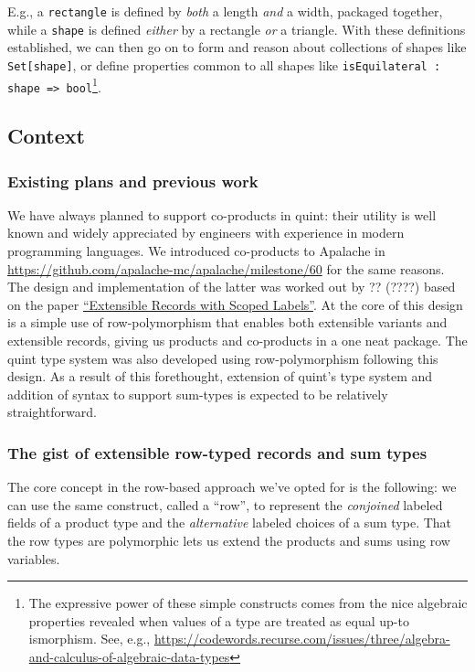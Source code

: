 \documentclass[11pt]{article}
\begin{document}
E.g., a \texttt{rectangle} is defined by \emph{both} a length \emph{and} a width,
packaged together, while a \texttt{shape} is defined \emph{either} by a rectangle
\emph{or} a triangle. With these definitions established, we can then go on
to form and reason about collections of shapes like \texttt{Set[shape]}, or
define properties common to all shapes like
\texttt{isEquilateral : shape => bool}\footnote{The expressive power of these simple constructs comes from the
nice algebraic properties revealed when values of a type are
treated as equal up-to ismorphism. See, e.g.,
\url{https://codewords.recurse.com/issues/three/algebra-and-calculus-of-algebraic-data-types}}.

\subsection{Context}
\label{sec:orgea625f3}
\subsubsection{Existing plans and previous work}
\label{sec:orgc77cf04}
We have always planned to support co-products in quint: their utility is well
known and widely appreciated by engineers with experience in modern programming
languages. We introduced co-products to Apalache in
\url{https://github.com/apalache-mc/apalache/milestone/60} for the same reasons.
The design and implementation of the latter was worked out by ?? (????)
based on the paper \href{https://www.microsoft.com/en-us/research/publication/extensible-records-with-scoped-labels/}{``Extensible Records with Scoped Labels''}. At the core of this
design is a simple use of row-polymorphism that enables both extensible variants
and extensible records, giving us products and co-products in a one neat
package. The quint type system was also developed using row-polymorphism
following this design. As a result of this forethought, extension of quint's
type system and addition of syntax to support sum-types is expected to be
relatively straightforward.

\subsubsection{The gist of extensible row-typed records and sum types}
\label{sec:org6428ac3}
The core concept in the row-based approach we've opted for is the
following: we can use the same construct, called a ``row'', to represent
the \emph{conjoined} labeled fields of a product type and the \emph{alternative}
labeled choices of a sum type. That the row types are polymorphic lets
us extend the products and sums using row variables.
\end{document}
